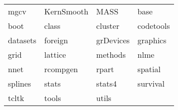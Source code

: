 \begin{tabular}{llll} 
mgcv & KernSmooth & MASS & base\\ 
boot & class & cluster & codetools\\ 
datasets & foreign & grDevices & graphics\\ 
grid & lattice & methods & nlme\\ 
nnet & rcompgen & rpart & spatial\\ 
splines & stats & stats4 & survival\\ 
tcltk  &  tools  &  utils  &   \\ 
\end{tabular}
